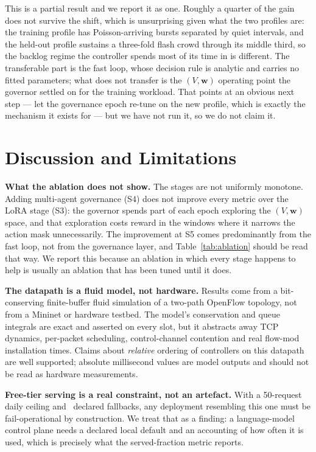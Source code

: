 \documentclass[conference]{IEEEtran}
\newcommand{\wvec}{\mathbf{w}}
\begin{document}
This is a partial result and we report it as one. Roughly a quarter of the gain
does not survive the shift, which is unsurprising given what the two profiles are:
the training profile has Poisson-arriving bursts separated by quiet intervals, and
the held-out profile sustains a three-fold flash crowd through its middle third,
so the backlog regime the controller spends most of its time in is different. The
transferable part is the fast loop, whose decision rule is analytic and carries no
fitted parameters; what does not transfer is the $(V,\wvec)$ operating point the
governor settled on for the training workload. That points at an obvious next
step --- let the governance epoch re-tune on the new profile, which is exactly the
mechanism it exists for --- but we have not run it, so we do not claim it.

\section{Discussion and Limitations}\label{sec:discussion}

\textbf{What the ablation does not show.} The stages are not uniformly monotone.
Adding multi-agent governance (S4) does not improve every metric over the LoRA
stage (S3): the governor spends part of each epoch exploring the $(V,\wvec)$ space,
and that exploration costs reward in the windows where it narrows the action mask
unnecessarily. The improvement at S5 comes predominantly from the fast loop, not
from the governance layer, and Table~\ref{tab:ablation} should be read that way. We
report this because an ablation in which every stage happens to help is usually an
ablation that has been tuned until it does.

\textbf{The datapath is a fluid model, not hardware.} Results come from a
bit-conserving finite-buffer fluid simulation of a two-path OpenFlow topology, not
from a Mininet or hardware testbed. The model's conservation and queue integrals
are exact and asserted on every slot, but it abstracts away TCP dynamics, per-packet
scheduling, control-channel contention and real flow-mod installation times. Claims
about \emph{relative} ordering of controllers on this datapath are well supported;
absolute millisecond values are model outputs and should not be read as hardware
measurements.

\textbf{Free-tier serving is a real constraint, not an artefact.} With a 50-request
daily ceiling and \ResLLMFallbacks\ declared fallbacks, any deployment resembling
this one must be fail-operational by construction. We treat that as a finding: a
language-model control plane needs a declared local default and an accounting of how
often it is used, which is precisely what the served-fraction metric reports.
\end{document}
